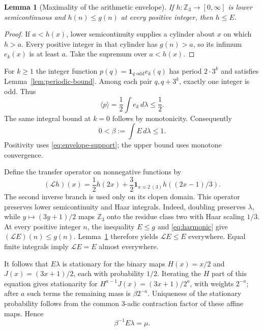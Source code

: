 \documentclass[11pt]{article}
\newtheorem{lemma}[theorem]{Lemma}
\theoremstyle{remark}
\newcommand{\Zthree}{\mathbb Z_3}
\newcommand{\one}{\mathbf 1}
\newcommand{\LL}{\mathcal L}
\newcommand{\avg}[1]{\langle #1\rangle}
\begin{document}
\begin{lemma}[Maximality of the arithmetic envelope]\label{lem:maximal}
If \(h:\Zthree\to[0,\infty]\) is lower semicontinuous and
\(h(n)\leq g(n)\) at every positive integer, then \(h\leq E\).
\end{lemma}

\begin{proof}
If \(a<h(x)\), lower semicontinuity supplies a cylinder about
\(x\) on which \(h>a\). Every positive integer in that cylinder
has \(g(n)>a\), so its infimum \(e_k(x)\) is at least \(a\).
Take the supremum over \(a<h(x)\).
\end{proof}

For \(k\geq1\) the integer function
\(p(q)=\one_{q\text{ odd}}e_k(q)\) has period \(2\cdot3^k\)
and satisfies Lemma~\ref{lem:periodic-bound}. Among each pair
\(q,q+3^k\), exactly one integer is odd. Thus
\[
 \avg p=\frac12\int e_k\,d\lambda\leq\frac12.
\]
The same integral bound at \(k=0\) follows by monotonicity.
Consequently
\begin{equation}\label{eq:beta}
 0<\beta:=\int E\,d\lambda\leq1.
\end{equation}
Positivity uses \eqref{eq:envelope-support}; the upper bound uses
monotone convergence.

Define the transfer operator on nonnegative functions by
\[
 (\LL h)(x)=\frac12h(2x)+
 \frac32\one_{x\equiv2\ (3)}h((2x-1)/3).
\]
The second inverse branch is used only on its clopen domain.
This operator preserves lower semicontinuity and Haar integrals.
Indeed, doubling preserves \(\lambda\), while
\(y\mapsto(3y+1)/2\) maps \(\Zthree\) onto the residue class
two with Haar scaling \(1/3\).
At every positive integer \(n\), the inequality \(E\leq g\)
and \eqref{eq:harmonic} give \((\LL E)(n)\leq g(n)\).
Lemma~\ref{lem:maximal} therefore yields \(\LL E\leq E\)
everywhere. Equal finite integrals imply \(\LL E=E\) almost
everywhere.

It follows that \(E\lambda\) is stationary for the binary maps
\(H(x)=x/2\) and \(J(x)=(3x+1)/2\), each with probability
\(1/2\). Iterating the \(H\) part of this equation gives
stationarity for \(H^{a-1}J(x)=(3x+1)/2^a\), with weights
\(2^{-a}\); after \(a\) such terms the remaining mass is
\(\beta2^{-a}\).
Uniqueness of the stationary probability follows from the common
\(3\)-adic contraction factor of these affine maps. Hence
\begin{equation}\label{eq:normalized}
 \beta^{-1}E\lambda=\mu.
\end{equation}
\end{document}
